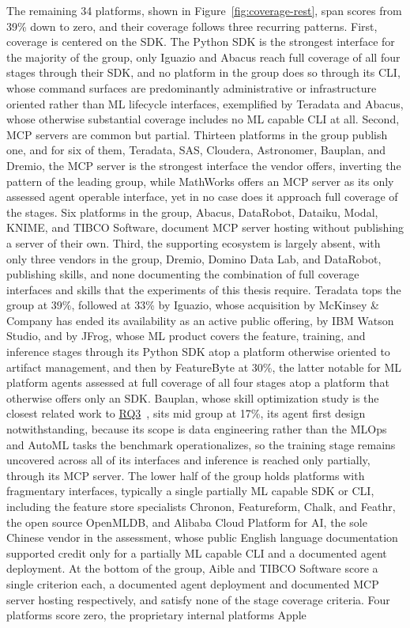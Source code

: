 \documentclass[
english,                 %
bibtex,                  %
]{kththesis}
\numberwithin{listing}{chapter}
\begin{document}
The remaining 34 platforms, shown in Figure~\ref{fig:coverage-rest}, span scores from 39\% down to zero, and their coverage follows three recurring patterns. First, coverage is centered on the \gls{SDK}. The Python \gls{SDK} is the strongest interface for the majority of the group, only Iguazio and Abacus reach full coverage of all four stages through their \gls{SDK}, and no platform in the group does so through its \gls{CLI}, whose command surfaces are predominantly administrative or infrastructure oriented rather than \gls{ML} lifecycle interfaces, exemplified by Teradata and Abacus, whose otherwise substantial coverage includes no \gls{ML} capable \gls{CLI} at all. Second, \gls{MCP} servers are common but partial. Thirteen platforms in the group publish one, and for six of them, Teradata, \gls{SAS}, Cloudera, Astronomer, Bauplan, and Dremio, the \gls{MCP} server is the strongest interface the vendor offers, inverting the pattern of the leading group, while MathWorks offers an \gls{MCP} server as its only assessed agent operable interface, yet in no case does it approach full coverage of the stages. Six platforms in the group, Abacus, DataRobot, Dataiku, Modal, \gls{KNIME}, and \gls{TIBCO} Software, document \gls{MCP} server hosting without publishing a server of their own. Third, the supporting ecosystem is largely absent, with only three vendors in the group, Dremio, Domino Data Lab, and DataRobot, publishing skills, and none documenting the combination of full coverage interfaces and skills that the experiments of this thesis require. Teradata tops the group at 39\%, followed at 33\% by Iguazio, whose acquisition by McKinsey \& Company has ended its availability as an active public offering, by \gls{IBM} Watson Studio, and by JFrog, whose \gls{ML} product covers the feature, training, and inference stages through its Python \gls{SDK} atop a platform otherwise oriented to artifact management, and then by FeatureByte at 30\%, the latter notable for \gls{ML} platform agents assessed at full coverage of all four stages atop a platform that otherwise offers only an \gls{SDK}. Bauplan, whose skill optimization study is the closest related work to \hyperref[rq3]{RQ3}~\cite{schneider_skill_2026}, sits mid group at 17\%, its agent first design notwithstanding, because its scope is data engineering rather than the \gls{MLOps} and \gls{AutoML} tasks the benchmark operationalizes, so the training stage remains uncovered across all of its interfaces and inference is reached only partially, through its \gls{MCP} server. The lower half of the group holds platforms with fragmentary interfaces, typically a single partially \gls{ML} capable \gls{SDK} or \gls{CLI}, including the feature store specialists Chronon, Featureform, Chalk, and Feathr, the open source \gls{OpenMLDB}, and Alibaba Cloud Platform for \gls{AI}, the sole Chinese vendor in the assessment, whose public English language documentation supported credit only for a partially \gls{ML} capable \gls{CLI} and a documented agent deployment. At the bottom of the group, Aible and \gls{TIBCO} Software score a single criterion each, a documented agent deployment and documented \gls{MCP} server hosting respectively, and satisfy none of the stage coverage criteria. Four platforms score zero, the proprietary internal platforms Apple 
\end{document}
